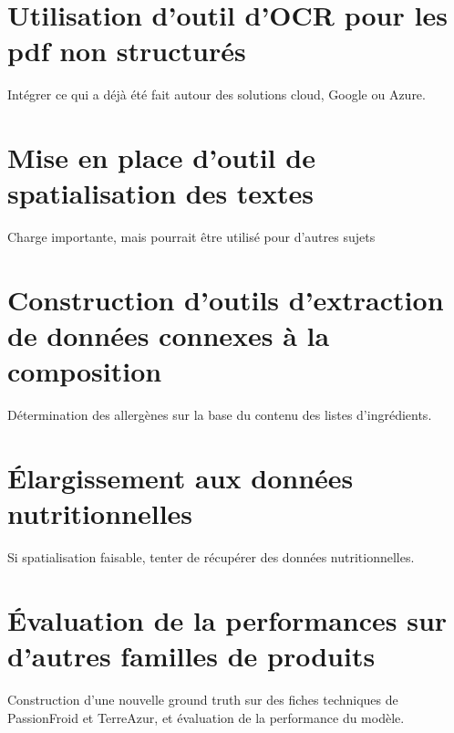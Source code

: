         \section{Utilisation d'outil d'OCR pour les pdf non structurés}
        Intégrer ce qui a déjà été fait autour des solutions cloud, Google ou Azure.

        \section{Mise en place d'outil de spatialisation des textes}
        Charge importante, mais pourrait être utilisé pour d'autres sujets

        \section{Construction d'outils d'extraction de données connexes à la composition}
        Détermination des allergènes sur la base du contenu des listes d'ingrédients.

        \section{\'{E}largissement aux données nutritionnelles}
        Si spatialisation faisable, tenter de récupérer des données nutritionnelles.

        \section{\'{E}valuation de la performances sur d'autres familles de produits}
        Construction d'une nouvelle ground truth sur des fiches techniques de PassionFroid et TerreAzur, et évaluation de la performance du modèle.
